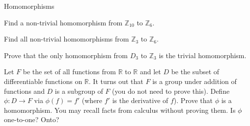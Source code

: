 \begin{section}{Homomorphisms}
\begin{problem}
Find a non-trivial homomorphism from $\mathbb{Z}_{10}$ to $\mathbb{Z}_6$.
\end{problem}

\begin{problem}
Find all non-trivial homomorphisms from $\mathbb{Z}_3$ to $\mathbb{Z}_6$.
\end{problem}

\begin{problem}
Prove that the only homomorphism from $D_3$ to $\mathbb{Z}_3$ is the trivial homomorphism.
\end{problem}

\begin{problem}
Let $F$ be the set of all functions from $\mathbb{R}$ to $\mathbb{R}$ and let $D$ be the subset of differentiable functions on $\mathbb{R}$.  It turns out that $F$ is a group under addition of functions and $D$ is a subgroup of $F$ (you do not need to prove this). Define $\phi:D\to F$ via $\phi(f)=f'$ (where $f'$ is the derivative of $f$). Prove that $\phi$ is a homomorphism.  You may recall facts from calculus without proving them. Is $\phi$ one-to-one? Onto? 
\end{problem}

\end{section}

